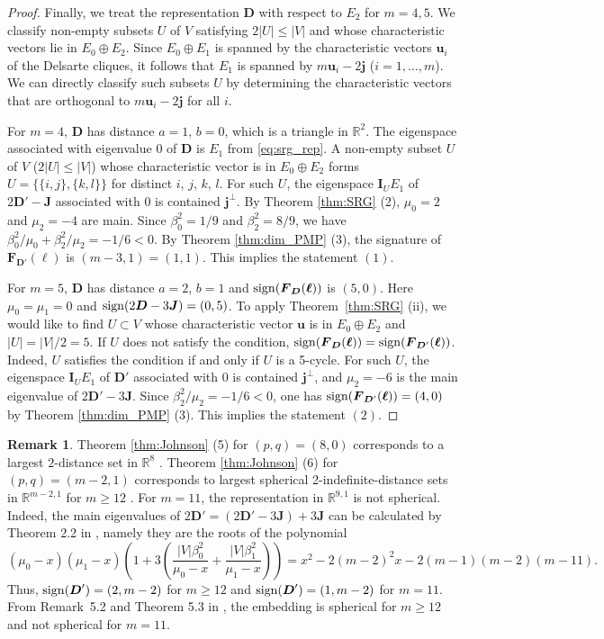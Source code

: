 \documentclass[a4paper, 11pt]{article}
\newcommand{\J}{\boldsymbol{J}}
\newcommand{\I}{\boldsymbol{I}}
\newcommand{\D}{\boldsymbol{D}}
\newcommand{\F}{\boldsymbol{F}}
\newcommand{\jv}{\boldsymbol{j}}
\newcommand{\uv}{\boldsymbol{u}}
\newcommand{\el}{\boldsymbol{\ell}}
\theoremstyle{definition}
\newtheorem{remark}[theorem]{Remark}
\begin{document}
\begin{proof}
Finally, we treat the representation $\D$ with respect to $E_2$ for $m=4,5$. 
We classify non-empty subsets $U$ of $V$ satisfying $2|U| \leq |V|$ and whose characteristic vectors lie in $E_0 \oplus E_2$. 
Since $E_0 \oplus E_1$ is spanned by the characteristic vectors $\uv_i$ of the Delsarte cliques, it follows that $E_1$ is spanned by $m \uv_i-2\jv$ ($i=1,\ldots,m$). 
We can directly classify such subsets $U$ by determining the characteristic vectors that are orthogonal to $m\uv_i - 2\jv$ for all $i$. 

For $m=4$,  $\D$ has distance $a=1$, $b=0$, which is a triangle in $\mathbb{R}^2$. The eigenspace associated with eigenvalue 0 of $\D$ is $E_1$ from \eqref{eq:srg_rep}. 
A non-empty subset $U$ of $V$ ($2|U|\leq |V|$) whose characteristic vector is  in $E_0 \oplus E_2$ forms $U=\{\{i,j\},\{k,l\}\}$ for distinct $i$, $j$, $k$, $l$. For such $U$, the eigenspace $\I_U E_1$ of $2\D'-\J$ associated with $0$ is contained $\jv^\perp$. 
By Theorem \ref{thm:SRG} (2), $\mu_0=2$ and $\mu_2=-4$ are main. Since $\beta_0^2=1/9$ and $\beta_2^2=8/9$, we have $\beta_0^2/\mu_0+\beta_2^2/\mu_2=-1/6<0$.  
By Theorem \ref{thm:dim_PMP} (3), the signature of $\F_{\D'}(\el)$ is $(m-3,1)=(1,1)$.  
This implies the statement $(1)$. 

For $m=5$, $\D$ has distance $a=2$, $b=1$ and ${\rm sign}(\F_{\D}(\el))$ is $(5,0)$. Here $\mu_0=\mu_1=0$ and ${\rm sign}(2\D- 3 \J )=(0,5)$. 
To apply Theorem~\ref{thm:SRG} (ii), we would like to find $U\subset V$ whose characteristic vector $\uv$ is in $E_0\oplus E_2$ and $|U|=|V|/2=5$. If $U$ does not satisfy the condition, ${\rm sign}(\F_{\D}(\el))={\rm sign}(\F_{\D'}(\el))$. Indeed,  $U
$ satisfies the condition if and only if $U$ is a 5-cycle. For such $U$, the eigenspace $\I_U E_1$ of $\D'$ associated with $0$ is contained $\jv^\perp$, and $\mu_2=-6$ is the main eigenvalue of $2\D'-3 \J$. Since $\beta_2^2/\mu_2=-1/6<0$, one has ${\rm sign}(\F_{\D'}(\el))=(4,0)$ by Theorem \ref{thm:dim_PMP} (3). 
This implies the statement $(2)$. 
\end{proof}

\begin{remark}
Theorem \ref{thm:Johnson} (5) for $(p,q)=(8,0)$ corresponds to a largest $2$-distance set in $\mathbb{R}^8$ \cite{L97}. 
Theorem \ref{thm:Johnson} (6) for $(p,q)=(m-2,1)$ corresponds to 
 largest spherical 2-indefinite-distance sets  in $\mathbb{R}^{m-2,1}$ for $m\geq 12$ \cite{L97}. 
For $m=11$, the representation in $\mathbb{R}^{9,1}$ is not spherical. 
Indeed, the main eigenvalues of $2\D'=(2\D'-3\J)+3\J$ can be calculated by Theorem 2.2 in \cite{NS16}, namely they are the roots of the polynomial 
\[
(\mu_0-x)(\mu_1-x)\left(1+3\left( \frac{|V|\beta_0^2}{\mu_0-x}+\frac{|V|\beta_1^2}{\mu_1-x}\right) \right)=x^2-2(m-2)^2
x -2(m-1)(m-2)(m-11).\] 
Thus, ${\rm sign}(\D')=(2,m-2)$ for $m\geq 12$ and ${\rm sign}(\D')=(1,m-2)$ for $m = 11$. 
From Remark~5.2 and Theorem 5.3 in \cite{NSSpre}, 
the embedding is spherical for $m\geq 12$ and not spherical for $m=11$. 
\end{remark}
\end{document}
